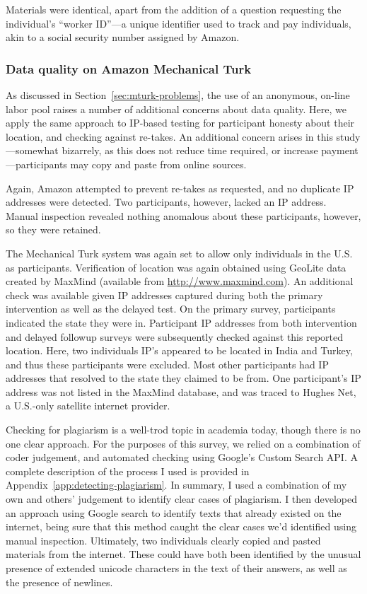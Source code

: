 Materials were identical, apart from the addition of a question requesting the
individual's “worker ID”---a unique identifier used to track and pay
individuals, akin to a social security number assigned by Amazon.

\subsubsection{Data quality on Amazon Mechanical Turk}

As discussed in Section~\ref{sec:mturk-problems}, the use of an anonymous,
on-line labor pool raises a number of additional concerns about data quality.
Here, we apply the same approach to IP-based testing for participant honesty
about their location, and checking against re-takes.  An additional concern
arises in this study---somewhat bizarrely, as this does not reduce time
required, or increase payment---participants may copy and paste from online
sources.

Again, Amazon attempted to prevent re-takes as requested, and no duplicate IP
addresses were detected. Two participants, however, lacked an IP address.
Manual inspection revealed nothing anomalous about these participants, however,
so they were retained.

The Mechanical Turk system was again set to allow only individuals in the U.S.
as participants. Verification of location was again obtained using GeoLite data
created by MaxMind (available from \url{http://www.maxmind.com}).  An additional
check was available given IP addresses captured during both the primary
intervention as well as the delayed test. On the primary survey, participants
indicated the state they were in.  Participant IP addresses from both
intervention and delayed followup surveys were subsequently checked against this
reported location. Here, two individuals IP’s appeared to be located in India
and Turkey, and thus these participants were excluded. Most other participants
had IP addresses that resolved to the state they claimed to be from. One
participant’s IP address was not listed in the MaxMind database, and was traced
to Hughes Net, a U.S.-only satellite internet provider.

Checking for plagiarism is a well-trod topic in academia today, though there is
no one clear approach. For the purposes of this survey, we relied on a
combination of coder judgement, and automated checking using Google’s Custom
Search API. A complete description of the process I used is provided in
Appendix~\ref{app:detecting-plagiarism}. In summary, I used a combination of my
own and others' judgement to identify clear cases of plagiarism. I then
developed an approach using Google search to identify texts that already existed
on the internet, being sure that this method caught the clear cases we’d
identified using manual inspection. Ultimately, two individuals clearly 
copied and pasted materials from the internet. These could have both been
identified by the unusual presence of extended unicode characters in the text of
their answers, as well as the presence of newlines.

